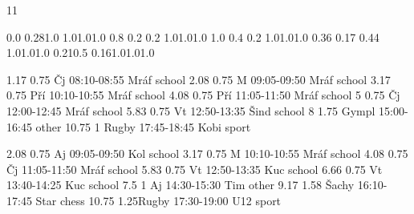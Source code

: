 \documentclass[a4paper,10pt]{report}
\begin{document}
\thispagestyle{empty}
\begin{landscape}
\setslotsize{2.5cm}{0.9cm}
 {11}
\settextframe{0.8mm}




   {0.0} {0.28}{1.0} {1.0}{1.0}{1.0}
    {0.8} {0.2} {0.2} {1.0}{1.0}{1.0}
    {1.0} {0.4} {0.2} {1.0}{1.0}{1.0}
 {0.36} {0.17} {0.44} {1.0}{1.0}{1.0}
    {0.21}{0.5} {0.16}{1.0}{1.0}{1.0}

\begin{timetable}
   
   {1.17} {0.75} {Čj}                {08:10-08:55}        {Mráf}     {school}
   {2.08} {0.75} {M}                 {09:05-09:50}        {Mráf}     {school}
   {3.17} {0.75} {Pří}               {10:10-10:55}        {Mráf}     {school}
   {4.08} {0.75} {Pří}               {11:05-11:50}        {Mráf}     {school}
   {5} {0.75}    {Čj}                {12:00-12:45}        {Mráf}     {school}
   {5.83} {0.75} {Vt}                {12:50-13:35}        {Šind}     {school}
   {8} {1.75}    {Gympl}             {15:00-16:45}        {}     {other}
   {10.75} {1}   {Rugby}             {17:45-18:45}        {Kobi}     {sport}
  
   {2.08} {0.75} {Aj}                {09:05-09:50}        {Kol}     {school}
   {3.17} {0.75} {M}                 {10:10-10:55}        {Mráf}     {school}
   {4.08} {0.75} {Čj}                {11:05-11:50}        {Mráf}     {school}
   {5.83} {0.75} {Vt}                {12:50-13:35}        {Kuc}     {school}
   {6.66} {0.75} {Vt}                {13:40-14:25}        {Kuc}     {school}
   {7.5} {1}     {Aj}                {14:30-15:30}        {Tim}     {other}
   {9.17} {1.58} {Šachy}             {16:10-17:45}        {Star}     {chess}
   {10.75} {1.25}{Rugby}             {17:30-19:00}        {U12}     {sport}


\end{timetable}
\end{landscape}
\end{document}
